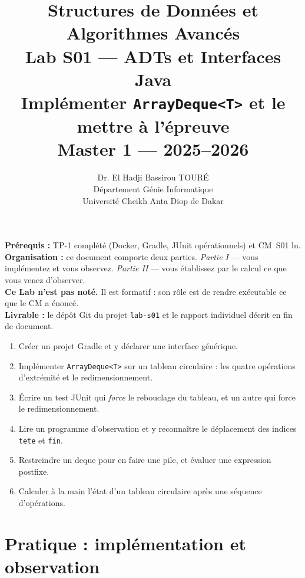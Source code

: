 \documentclass[11pt,a4paper]{article}
\title{%
\vspace{-1cm}
\textbf{\LARGE Structures de Données et}\\
\textbf{\LARGE Algorithmes Avancés}\\[0.8cm]
\textbf{\huge Lab S01 --- ADTs et Interfaces Java}\\[0.3cm]
\textbf{\Large Implémenter \texttt{ArrayDeque<T>} et le mettre à l'épreuve}\\[0.5cm]
\large Master 1 --- 2025--2026}
\author{Dr. El Hadji Bassirou TOURÉ\\
Département Génie Informatique\\
Université Cheikh Anta Diop de Dakar}
\date{}
\begin{document}
\maketitle
\thispagestyle{empty}

\begin{prereqbox}
\textbf{Prérequis :} TP-1 complété (Docker, Gradle, JUnit opérationnels) et
CM~S01 lu.\\[4pt]
\textbf{Organisation :} ce document comporte deux parties.
\emph{Partie I} --- vous implémentez et vous observez.
\emph{Partie II} --- vous établissez par le calcul ce que vous venez
d'observer.\\[4pt]
\textbf{Ce Lab n'est pas noté.} Il est formatif : son rôle est de rendre
exécutable ce que le CM a énoncé.\\[4pt]
\textbf{Livrable :} le dépôt Git du projet \texttt{lab-s01} et le rapport
individuel décrit en fin de document.
\end{prereqbox}

\begin{objectifbox}
\begin{enumerate}[nosep]
    \item Créer un projet Gradle et y déclarer une interface générique.
    \item Implémenter \texttt{ArrayDeque<T>} sur un tableau circulaire :
          les quatre opérations d'extrémité et le redimensionnement.
    \item Écrire un test JUnit qui \emph{force} le rebouclage du tableau,
          et un autre qui force le redimensionnement.
    \item Lire un programme d'observation et y reconnaître le déplacement
          des indices \texttt{tete} et \texttt{fin}.
    \item Restreindre un deque pour en faire une pile, et évaluer une
          expression postfixe.
    \item Calculer à la main l'état d'un tableau circulaire après une
          séquence d'opérations.
\end{enumerate}
\end{objectifbox}

\tableofcontents
\newpage

\part{Pratique : implémentation et observation}
\end{document}
